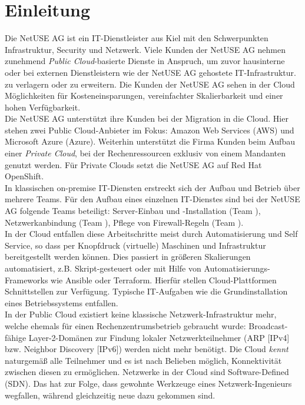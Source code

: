 \chapter{Einleitung}

Die NetUSE AG ist ein IT-Dienstleister aus Kiel mit den Schwerpunkten Infrastruktur, Security und Netzwerk. Viele Kunden der NetUSE AG nehmen zunehmend \textit{Public Cloud}-basierte Dienste in Anspruch, um zuvor hausinterne oder bei externen Dienstleistern wie der NetUSE AG gehostete IT-Infrastruktur.
zu verlagern oder zu erweitern. Die Kunden der NetUSE AG sehen in der Cloud Möglichkeiten für Kosteneinsparungen, vereinfachter Skalierbarkeit und einer hohen Verfügbarkeit.\\
Die NetUSE AG unterstützt ihre Kunden bei der Migration in die Cloud. Hier stehen zwei Public Cloud-Anbieter im Fokus: Amazon Web Services (AWS) und Microsoft Azure (Azure). Weiterhin unterstützt die Firma Kunden beim Aufbau einer \textit{Private Cloud}, bei der Rechenressourcen exklusiv von einem Mandanten genutzt werden. Für Private Clouds setzt die NetUSE AG auf Red Hat OpenShift.\\
In klassischen on-premise IT-Diensten erstreckt sich der Aufbau und Betrieb über mehrere Teams. Für den Aufbau eines einzelnen IT-Dienstes sind bei der NetUSE AG folgende Teams beteiligt: Server-Einbau und -Installation (Team \grqq{}), Netzwerkanbindung (Team \grqq{}), Pflege von Firewall-Regeln (Team \grqq{}).\\
In der Cloud entfallen diese Arbeitschritte meist durch Automatisierung und Self Service, so dass per Knopfdruck (virtuelle) Maschinen und Infrastruktur bereitgestellt werden können\cite{Karlstetter2017a}. Dies passiert in größeren Skalierungen automatisiert, z.B. Skript-gesteuert oder mit Hilfe von Automatisierungs-Frameworks wie Ansible oder Terraform. Hierfür stellen Cloud-Plattformen Schnittstellen zur Verfügung\cite{edelman2018}\cite{Brikman2019}. Typische IT-Aufgaben wie die Grundinstallation eines Betriebssystems entfallen.\\
In der Public Cloud existiert keine klassische Netzwerk-Infrastruktur mehr, welche ehemals für einen Rechenzentrumsbetrieb gebraucht wurde: Broadcast-fähige Layer-2-Domänen zur Findung lokaler Netzwerkteilnehmer (ARP [IPv4] bzw. Neighbor Discovery [IPv6]) werden nicht mehr benötigt. Die Cloud \textit{kennt} naturgemäß alle Teilnehmer und es ist nach Belieben möglich, Konnektivität zwischen diesen zu ermöglichen. Netzwerke in der Cloud sind Software-Defined (SDN)\cite{Seidel2015}. Das hat zur Folge, dass gewohnte Werkzeuge eines Netzwerk-Ingenieurs wegfallen, während gleichzeitig neue dazu gekommen sind.

